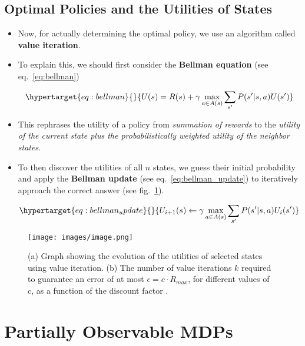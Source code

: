 \documentclass[
]{book}
\begin{document}
\hypertarget{optimal-policies-and-the-utilities-of-states}{%
\subsection{Optimal Policies and the Utilities of
States}\label{optimal-policies-and-the-utilities-of-states}}

\begin{itemize}
\item
  Now, for actually determining the optimal policy, we use an algorithm
  called \textbf{value iteration}.
\item
  To explain this, we should first consider the \textbf{Bellman
  equation} (see eq.~\ref{eq:bellman})

  \begin{equation}\protect\hypertarget{eq:bellman}{}{
  U(s) = R(s) + \gamma \max_{a \in A(s)} \sum_{s'}P(s' | s,a)U(s')
  }\label{eq:bellman}\end{equation}
\item
  This rephrases the utility of a policy from \emph{summation of
  rewards} to the \emph{utility of the current state plus the
  probabilistically weighted utility of the neighbor states}.
\item
  To then discover the utilities of all \(n\) states, we guess their
  initial probability and apply the \textbf{Bellman update} (see
  eq.~\ref{eq:bellman_update}) to iteratively approach the correct
  answer (see fig.~\ref{fig:bellman_update}).

  \begin{equation}\protect\hypertarget{eq:bellman_update}{}{
  U_{i+1}(s) \leftarrow \gamma \max_{a \in A(s)} \sum_{s'} P(s'|s, a)U_i(s')
  }\label{eq:bellman_update}\end{equation}
\end{itemize}

\begin{figure}
\hypertarget{fig:bellman_update}{%
\centering
\texttt{[image: images/image.png]}
\caption{(a) Graph showing the evolution of the utilities of selected
states using value iteration. (b) The number of value iterations \(k\)
required to guarantee an error of at most
\(\epsilon = c \cdot R_{max}\), for different values of c, as a function
of the discount factor \gamma.}\label{fig:bellman_update}
}
\end{figure}

\hypertarget{partially-observable-mdps}{%
\section{Partially Observable MDPs}\label{partially-observable-mdps}}
\end{document}
